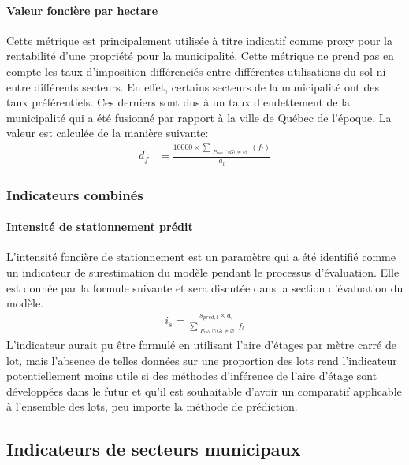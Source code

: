             \paragraph{Valeur foncière par hectare}
        Cette métrique est principalement utilisée à titre indicatif comme proxy pour la rentabilité d'une propriété pour la municipalité. Cette métrique ne prend pas en compte les taux d'imposition différenciés entre différentes utilisations du sol ni entre différents secteurs. En effet, certains secteurs de la municipalité ont des taux préférentiels. Ces derniers sont dus à un taux d'endettement de la municipalité qui a été fusionné par rapport à la ville de Québec de l'époque. La valeur est calculée de la manière suivante:
        \begin{align}
            d_f &= \frac{10000 \times \sum_{\substack{P_{role}\cap G_l\neq\varnothing}}{\left(f_l\right)} }{a_l}  \label{eq:lot-tax-density}
        \end{align}

        \subsubsection{Indicateurs combinés}
        
        \paragraph{Intensité de stationnement prédit} L'intensité foncière de stationnement est un paramètre qui a été identifié comme un indicateur de surestimation du modèle pendant le processus d'évaluation. Elle est donnée par la formule suivante et sera discutée dans la section d'évaluation du modèle.
        \begin{align}
            i_s = \frac{s_{pred,l} \times a_l}{\sum_{\substack{P_{role} \cap G_l\neq\varnothing}} f_l} \label{eq:intensite-stat-pred}
        \end{align}
        L'indicateur aurait pu être formulé en utilisant l'aire d'étages par mètre carré de lot, mais l'absence de telles données sur une proportion des lots rend l'indicateur potentiellement moins utile si des méthodes d'inférence de l'aire d'étage sont développées dans le futur et qu'il est souhaitable d'avoir un comparatif applicable à l'ensemble des lots, peu importe la méthode de prédiction.
    \subsection{Indicateurs de secteurs municipaux} \label{ssec:indicateurs-secteurs-municipaux}
